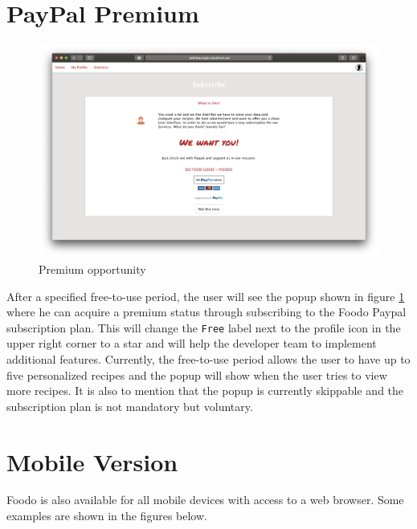 \section*{PayPal Premium}
\vspace{-2em}
\begin{figure}[H]
	\captionsetup{justification=centering}
	\begin{center}
		\includegraphics[scale=0.25]{Ressourcen/img/screenshots/screenshotR.png}
		\vspace{-2em}
		\caption{Premium opportunity}
		\label{fig:paypal}
	\end{center}
\end{figure}
After a specified free-to-use period, the user will see the popup shown in figure \ref{fig:paypal} where he can acquire a premium status through subscribing to the Foodo Paypal subscription plan. This will change the \texttt{Free} label next to the profile icon in the upper right corner to a star and will help the developer team to implement additional features. Currently, the free-to-use period allows the user to have up to five personalized recipes and the popup will show when the user tries to view more recipes. It is also to mention that the popup is currently skippable and the subscription plan is not mandatory but voluntary.  
\clearpage
\section*{Mobile Version}
Foodo is also available for all mobile devices with access to a web browser. Some examples are shown in the figures below.

